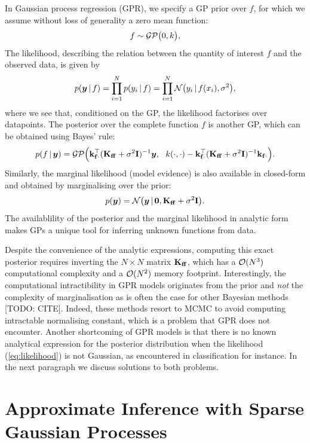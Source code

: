 In Gaussian process regression (GPR), we specify a GP prior over $f$, for which we assume without loss of generality a zero mean function:
\begin{equation}
  f \sim \mathcal{GP}\big(0, k\big),
\end{equation}
The likelihood, describing the relation between the quantity of interest $f$ and the observed data, is given by 
\begin{equation}
  \label{eq:likelihood}
  p(\vy \given f) = \prod_{i=1}^N p(y_i \given f) = \prod_{i=1}^N \NormDist{y_i \given f(x_i), \sigma^2},
\end{equation}
where we see that, conditioned on the GP, the likelihood factorises over datapoints. The posterior over the complete function $f$ is another GP, which can be obtained using Bayes' rule:
\begin{equation}
  \label{eq:f-given-y}
  p(f \,|\, \bm{y}) 
      = \mathcal{GP}\Big(\mathbf{k}_{\mathbf{f} \cdot}^\top (\mathbf{{K}}_{\mathbf{f} \mathbf{f}} + \sigma^2 \mathbf{{I}})^{-1} \bm{y},\ \ k(\cdot, \cdot) -  \mathbf{k}_{\mathbf{f} \cdot}^\top (\mathbf{{K}}_{\mathbf{f} \mathbf{f}} + \sigma^2 \mathbf{{I}})^{-1} \mathbf{k}_{\mathbf{f} \cdot}\Big).
\end{equation}
Similarly, the marginal likelihood (model evidence) is also available in closed-form and obtained by marginalising over the prior:
\begin{equation}
  \label{eq:log-marginal-likelihood}
  p(\vy) = \NormDist{\vy \given \vzero, \Kff + \sigma^2 \Eye}.
\end{equation}
The availablility of the posterior and the marginal likelihood in analytic form makes GPs a unique tool for inferring unknown functions from data. 

Despite the convenience of the analytic expressions, computing this exact posterior requires inverting the $N \times N$ matrix $\Kff$, which has a $\mathcal{O}(N^3)$ computational complexity and a $\mathcal{O}(N^2)$ memory footprint. Interestingly, the computational intractibility in GPR models originates from the prior and \emph{not} the complexity of marginalisation as is often the case for other Bayesian methods [TODO: CITE]. Indeed, these methods resort to MCMC to avoid computing intractable normalising constant, which is a problem that GPR does not encounter.  Another shortcoming of GPR models is that there is no known analytical expression for the posterior distribution when the likelihood (\cref{eq:likelihood}) is not Gaussian, as encountered in classification for instance. In the next paragraph we discuss solutions to both problems.

\section{Approximate Inference with Sparse Gaussian Processes}

